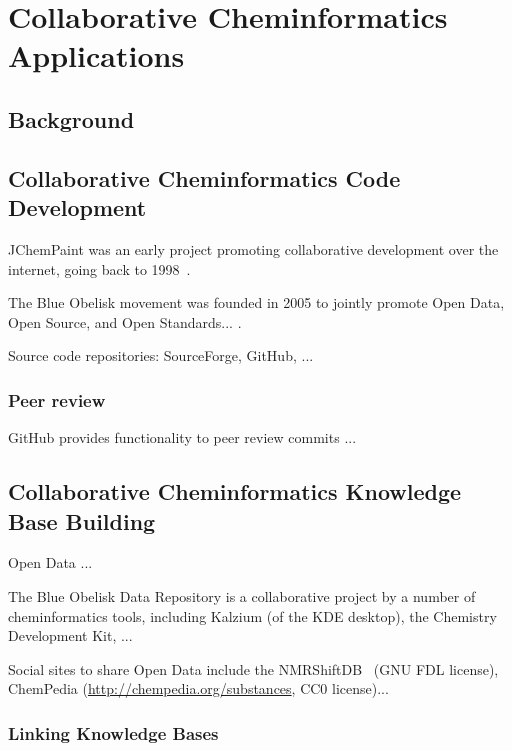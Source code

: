 \documentclass[12pt]{book}
\begin{document}
\chapter{Collaborative Cheminformatics Applications}

\section{Background}

\section{Collaborative Cheminformatics Code Development}

JChemPaint was an early project promoting collaborative development over the
internet, going back to 1998~\cite{Krause2000}.

The Blue Obelisk movement was founded in 2005 to jointly promote Open Data,
Open Source, and Open Standards... \cite{Guha2006}.

Source code repositories: SourceForge, GitHub, ...

\subsection{Peer review}

GitHub provides functionality to peer review commits ...


\section{Collaborative Cheminformatics Knowledge Base Building}

Open Data ...

The Blue Obelisk Data Repository is a collaborative project by a number
of cheminformatics tools, including Kalzium (of the KDE desktop), the
Chemistry Development Kit, ...


Social sites to share Open Data include the
NMRShiftDB~\cite{Steinbeck2004} (GNU FDL license),
ChemPedia (\url{http://chempedia.org/substances}, CC0 license)...


\subsection{Linking Knowledge Bases}
\end{document}
